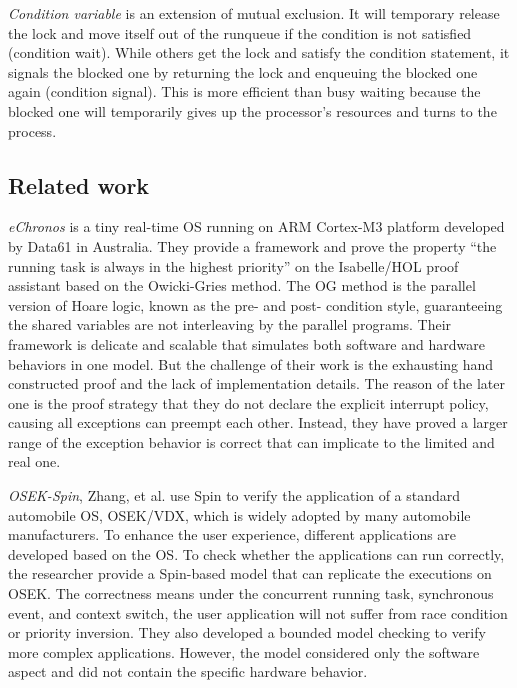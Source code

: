 \textit{Condition variable} is an extension of mutual exclusion. It will temporary release the lock and move itself out of the runqueue if the condition is not satisfied (condition wait). While others get the lock and satisfy the condition statement, it signals the blocked one by returning the lock and enqueuing the blocked one again (condition signal). This is more efficient than busy waiting because the blocked one will temporarily gives up the processor's resources and turns to the process.

\subsection{Related work}
\textit{eChronos} \cite{DBLP:conf/itp/AndronickLMMR16} is a tiny real-time OS running on ARM Cortex-M3 platform developed by Data61 in Australia. They provide a framework and prove the property ``the running task is always in the highest priority'' on the Isabelle/HOL proof assistant based on the Owicki-Gries \cite{Owicki:1976:APT:2696887.2697004} method. The OG method is the parallel version of Hoare logic, known as the pre- and post- condition style, guaranteeing the shared variables are not interleaving by the parallel programs. Their framework is delicate and scalable that simulates both software and hardware behaviors in one model. But the challenge of their work is the exhausting hand constructed proof and the lack of implementation details. The reason of the later one is the proof strategy that they do not declare the explicit interrupt policy, causing all exceptions can preempt each other. Instead, they have proved a larger range of the exception behavior is correct that can implicate to the limited and real one.

\textit{OSEK-Spin}, Zhang, et al. \cite{10.1007/978-3-319-17581-2_16} use Spin to verify the application of a standard automobile OS, OSEK/VDX, which is widely adopted by many automobile manufacturers. To enhance the user experience, different applications are developed based on the OS. To check whether the applications can run correctly, the researcher provide a Spin-based model that can replicate the executions on OSEK. The correctness means under the concurrent running task, synchronous event, and context switch, the user application will not suffer from race condition or priority inversion. They also developed a bounded model checking to verify more complex applications. However, the model considered only the software aspect and did not contain the specific hardware behavior.

